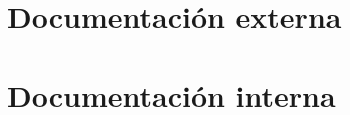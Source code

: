 \documentclass[a4paper,12pt,twoside,final]{book}
\begin{document}
\part{Documentación externa}

\part{Documentación interna}



%
%
\printbibliography

\renewcommand{\appendixpagename}{Anexos}
\renewcommand{\appendixtocname}{Anexos}
\renewcommand{\appendixname}{Anexo}
\end{document}
